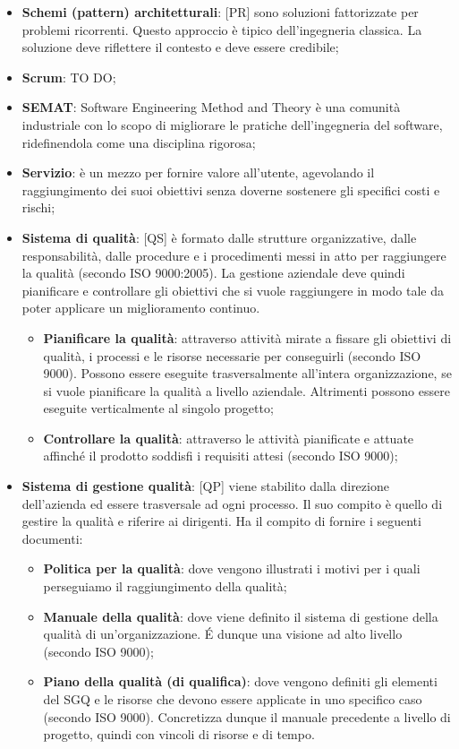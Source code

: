 \begin{itemize}
	\item \textbf{Schemi (pattern) architetturali}: [PR] sono soluzioni fattorizzate per problemi ricorrenti. Questo approccio è tipico dell'ingegneria classica. La soluzione deve riflettere il contesto e deve essere credibile;

	\item \textbf{Scrum}: TO DO;

	\item \textbf{SEMAT}: Software Engineering Method and Theory è una comunità industriale con lo scopo di migliorare le pratiche dell'ingegneria del software, ridefinendola come una disciplina rigorosa;

	\item \textbf{Servizio}: è un mezzo per fornire valore all'utente, agevolando il raggiungimento dei suoi obiettivi senza doverne sostenere gli specifici costi e rischi;

	\item \textbf{Sistema di qualità}: [QS] è formato dalle strutture organizzative, dalle responsabilità, dalle procedure e i procedimenti messi in atto per raggiungere la qualità (secondo ISO 9000:2005). La gestione aziendale deve quindi pianificare e controllare gli obiettivi che si vuole raggiungere in modo tale da poter applicare un miglioramento continuo.
		\begin{itemize}
			\item \textbf{Pianificare la qualità}: attraverso attività mirate a fissare gli obiettivi di qualità, i processi e le risorse necessarie per conseguirli (secondo ISO 9000). Possono essere eseguite trasversalmente all'intera organizzazione, se si vuole pianificare la qualità a livello aziendale. Altrimenti possono essere eseguite verticalmente al singolo progetto;
			\item \textbf{Controllare la qualità}: attraverso le attività pianificate e attuate affinché il prodotto soddisfi i requisiti attesi (secondo ISO 9000);
		\end{itemize}

	\item \textbf{Sistema di gestione qualità}: [QP] viene stabilito dalla direzione dell'azienda ed essere trasversale ad ogni processo. Il suo compito è quello di gestire la qualità e riferire ai dirigenti. Ha il compito di fornire i seguenti documenti:
		\begin{itemize}
			\item \textbf{Politica per la qualità}: dove vengono illustrati i motivi per i quali perseguiamo il raggiungimento della qualità;
			\item \textbf{Manuale della qualità}: dove viene definito il sistema di gestione della qualità di un'organizzazione. \'E dunque una visione ad alto livello (secondo ISO 9000);
			\item \textbf{Piano della qualità (di qualifica)}: dove vengono definiti gli elementi del SGQ e le risorse che devono essere applicate in uno specifico caso (secondo ISO 9000). Concretizza dunque il manuale precedente a livello di progetto, quindi con vincoli di risorse e di tempo.
		\end{itemize}


\end{itemize}
